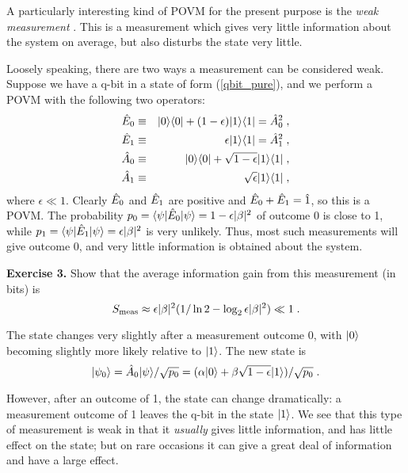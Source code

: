 A particularly interesting kind of POVM for the present purpose is the
{\it weak measurement} \cite{Vaidman}.
This is a measurement which gives very
little information about the system on average, but also disturbs the
state very little.

Loosely speaking, there are two ways a measurement can be
considered weak.  Suppose we have a q-bit in a state of form
(\ref{qbit_pure}), and we perform a POVM with the following two operators:
\begin{eqnarray}
{\hat E}_0 &\equiv& {| 0 \rangle}{\langle 0 |} + (1-\epsilon){| 1 \rangle}{\langle 1 |}
  = {\hat A}_0^2 \;, \nonumber\\ 
{\hat E}_1 &\equiv& \epsilon {| 1 \rangle}{\langle 1 |} = {\hat A}_1^2 \;, \nonumber\\
{\hat A}_0 &\equiv& {| 0 \rangle}{\langle 0 |} + \sqrt{1-\epsilon}{| 1 \rangle}{\langle 1 |}
  \;, \nonumber\\ 
{\hat A}_1 &\equiv& \sqrt\epsilon {| 1 \rangle}{\langle 1 |} \;,
\label{weak1}
\end{eqnarray}
where $\epsilon \ll 1$.  Clearly ${\hat E}_0$ and ${\hat E}_1$ are positive and
${\hat E}_0+{\hat E}_1={\hat 1}$, so this is a POVM.
The probability $p_0 = {\langle \psi |}{\hat E}_0{| \psi \rangle} = 1-\epsilon|\beta|^2$
of outcome 0 is close to 1, while
$p_1 = {\langle \psi |}{\hat E}_1{| \psi \rangle} = \epsilon|\beta|^2$ is
very unlikely.  Thus, most such measurements will give outcome 0, and very
little information is obtained about the system.

\medskip\noindent
{\bf Exercise 3.}  Show that the average information
gain from this measurement (in bits) is
\begin{equation}
S_{\rm meas} \approx  \epsilon|\beta|^2(1/\ln 2 - \log_2 \epsilon|\beta|^2)
  \ll 1 \;.
\end{equation}
\medskip

The state changes very slightly after a measurement outcome 0,
with ${| 0 \rangle}$ becoming slightly more likely relative to ${| 1 \rangle}$.
The new state is
\begin{equation}
{| \psi_0 \rangle} = {\hat A}_0{| \psi \rangle}/\sqrt{p_0}
  = (\alpha{| 0 \rangle} + \beta \sqrt{1-\epsilon}{| 1 \rangle})/\sqrt{p_0} \;.
\end{equation}

However, after an outcome of 1, the state can change dramatically:  a
measurement outcome of 1 leaves the q-bit in the state ${| 1 \rangle}$.  We see
that this type of measurement is weak in that it {\it usually} gives little
information, and has little effect on the state; but on rare occasions it
can give a great deal of information and have a large effect.

